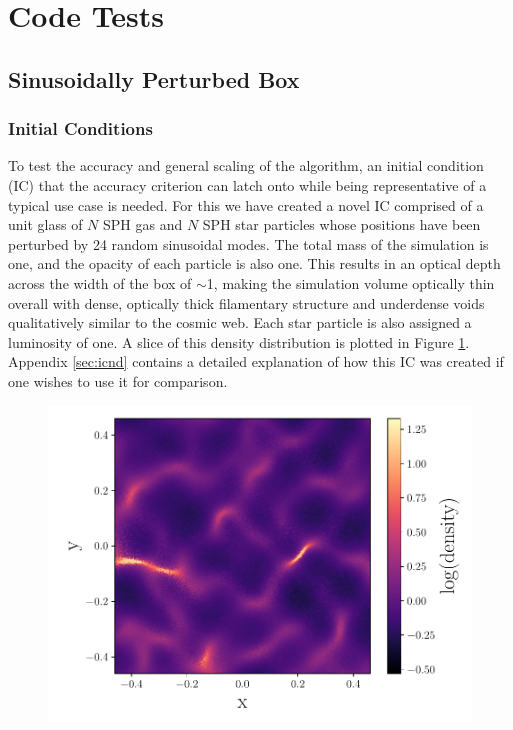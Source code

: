 \documentclass[fleq,usenatbib]{mnras}
\begin{document}
\section{Code Tests}\label{sec:tsts}
\subsection{Sinusoidally Perturbed Box}
\subsubsection{Initial Conditions}
To test the accuracy and general scaling of the algorithm, an initial 
condition (IC) that the accuracy criterion can latch onto while being 
representative of a typical use case is needed. For this we have created a 
novel IC comprised of a unit glass \citep{white1996} of $N$ SPH gas and $N$ 
SPH star particles whose positions have been perturbed by 24 random sinusoidal 
modes. The total mass of the simulation is one, and the opacity of each 
particle is also one. This results in an optical depth across the width of the 
box of $\sim$1, making the simulation volume optically thin overall with dense, 
optically thick filamentary structure and underdense voids qualitatively 
similar to the cosmic web. Each star particle is also assigned a luminosity of 
one. A slice of this density distribution is plotted in Figure 
\ref{fig:sine_rho}. Appendix \ref{sec:icnd} contains a detailed explanation of 
how this IC was created if one wishes to use it for comparison.
\begin{figure}
\includegraphics[width=1\linewidth]{Figures/sine_rho.pdf}
\caption{}
\label{fig:sine_rho}
\end{figure}
\end{document}

